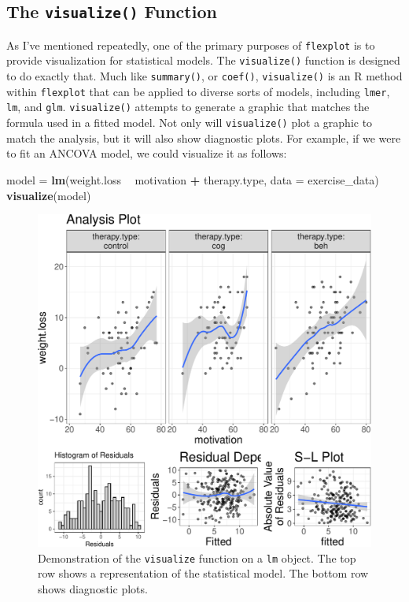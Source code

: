 \documentclass[
  doc]{apa6}
\newenvironment{Shaded}{\begin{snugshade}}{\end{snugshade}}
\newcommand{\DataTypeTok}[1]{\textcolor[rgb]{0.13,0.29,0.53}{#1}}
\newcommand{\KeywordTok}[1]{\textcolor[rgb]{0.13,0.29,0.53}{\textbf{#1}}}
\newcommand{\NormalTok}[1]{#1}
\newcommand{\OperatorTok}[1]{\textcolor[rgb]{0.81,0.36,0.00}{\textbf{#1}}}
\newcommand{\StringTok}[1]{\textcolor[rgb]{0.31,0.60,0.02}{#1}}
\begin{document}
\hypertarget{the-visualize-function}{%
\subsection{\texorpdfstring{The \texttt{visualize()} Function}{The visualize() Function}}\label{the-visualize-function}}

As I've mentioned repeatedly, one of the primary purposes of \texttt{flexplot} is to provide visualization for statistical models. The \texttt{visualize()} function is designed to do exactly that. Much like \texttt{summary()}, or \texttt{coef()}, \texttt{visualize()} is an R method within \texttt{flexplot} that can be applied to diverse sorts of models, including \texttt{lmer}, \texttt{lm}, and \texttt{glm}. \texttt{visualize()} attempts to generate a graphic that matches the formula used in a fitted model. Not only will \texttt{visualize()} plot a graphic to match the analysis, but it will also show diagnostic plots. For example, if we were to fit an ANCOVA model, we could visualize it as follows:

\begin{Shaded}
\begin{Highlighting}[]
\NormalTok{model =}\StringTok{ }\KeywordTok{lm}\NormalTok{(weight.loss }\OperatorTok{~}\StringTok{ }\NormalTok{motivation }\OperatorTok{+}\StringTok{ }\NormalTok{therapy.type, }
           \DataTypeTok{data =}\NormalTok{ exercise_data)}
\KeywordTok{visualize}\NormalTok{(model)}
\end{Highlighting}
\end{Shaded}

\begin{figure}
\centering
\includegraphics{flexplot_psychmeth_files/figure-latex/ancova-1.pdf}
\caption{\label{fig:ancova}Demonstration of the \texttt{visualize} function on a \texttt{lm} object. The top row shows a representation of the statistical model. The bottom row shows diagnostic plots. \label{fig:ancova}}
\end{figure}
\end{document}
